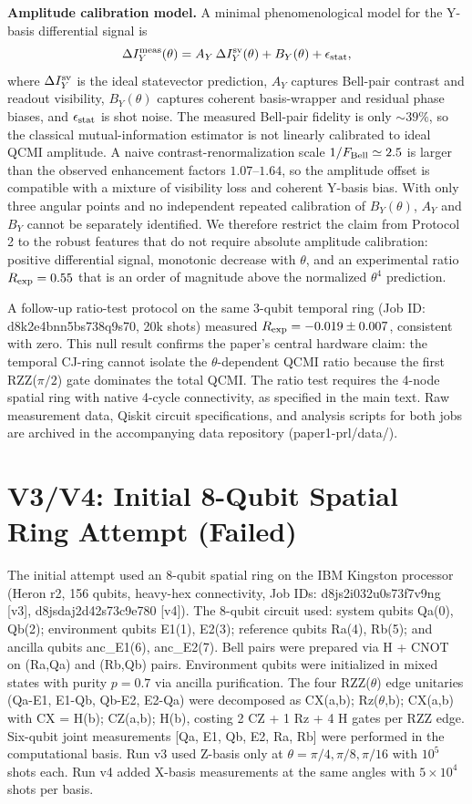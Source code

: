 \documentclass[aps,prl,superscriptaddress,nofootinbib]{revtex4-2}
\begin{document}
\textbf{Amplitude calibration model.} A minimal phenomenological model for the Y-basis differential signal is
\[
\Delta I_Y^{\rm meas}(\theta)=A_Y\,\Delta I_Y^{\rm sv}(\theta)+B_Y(\theta)+\epsilon_{\rm stat},
\]
where $\Delta I_Y^{\rm sv}$ is the ideal statevector prediction, $A_Y$ captures Bell-pair contrast and readout visibility, $B_Y(\theta)$ captures coherent basis-wrapper and residual phase biases, and $\epsilon_{\rm stat}$ is shot noise. The measured Bell-pair fidelity is only $\sim39\%$, so the classical mutual-information estimator is not linearly calibrated to ideal QCMI amplitude. A naive contrast-renormalization scale $1/F_{\rm Bell}\simeq2.5$ is larger than the observed enhancement factors $1.07$--$1.64$, so the amplitude offset is compatible with a mixture of visibility loss and coherent Y-basis bias. With only three angular points and no independent repeated calibration of $B_Y(\theta)$, $A_Y$ and $B_Y$ cannot be separately identified. We therefore restrict the claim from Protocol 2 to the robust features that do not require absolute amplitude calibration: positive differential signal, monotonic decrease with $\theta$, and an experimental ratio $R_{\rm exp}=0.55$ that is an order of magnitude above the normalized $\theta^4$ prediction.

A follow-up ratio-test protocol on the same 3-qubit temporal ring (Job ID: d8k2e4bnn5bs738q9s70, 20k shots) measured $R_{\rm exp} = -0.019 \pm 0.007$, consistent with zero. This null result confirms the paper's central hardware claim: the temporal CJ-ring cannot isolate the $\theta$-dependent QCMI ratio because the first RZZ($\pi/2$) gate dominates the total QCMI. The ratio test requires the 4-node spatial ring with native 4-cycle connectivity, as specified in the main text. Raw measurement data, Qiskit circuit specifications, and analysis scripts for both jobs are archived in the accompanying data repository (paper1-prl/data/).


\section{V3/V4: Initial 8-Qubit Spatial Ring Attempt (Failed)}
\label{sec:v3v4}

The initial attempt used an 8-qubit spatial ring on the IBM Kingston processor (Heron r2, 156 qubits, heavy-hex connectivity, Job IDs: d8js2i032u0s73f7v9ng [v3], d8jsdaj2d42s73c9e780 [v4]). The 8-qubit circuit used: system qubits Qa(0), Qb(2); environment qubits E1(1), E2(3); reference qubits Ra(4), Rb(5); and ancilla qubits anc\_E1(6), anc\_E2(7). Bell pairs were prepared via H + CNOT on (Ra,Qa) and (Rb,Qb) pairs. Environment qubits were initialized in mixed states with purity $p=0.7$ via ancilla purification. The four RZZ($\theta$) edge unitaries (Qa-E1, E1-Qb, Qb-E2, E2-Qa) were decomposed as CX(a,b); Rz($\theta$,b); CX(a,b) with CX = H(b); CZ(a,b); H(b), costing 2 CZ + 1 Rz + 4 H gates per RZZ edge. Six-qubit joint measurements [Qa, E1, Qb, E2, Ra, Rb] were performed in the computational basis. Run v3 used Z-basis only at $\theta=\pi/4,\pi/8,\pi/16$ with $10^5$ shots each. Run v4 added X-basis measurements at the same angles with $5\times10^4$ shots per basis.
\end{document}
